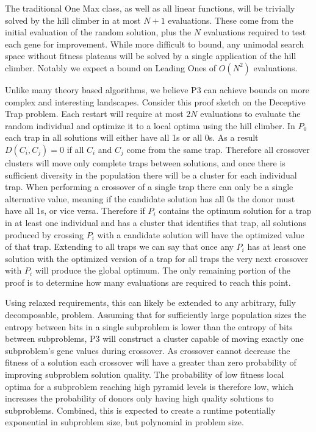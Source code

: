 \documentclass{sig-alternate}
\begin{document}
The traditional One Max class, as well as all linear functions, will be
trivially solved by the hill climber in at most $N+1$ evaluations.  These come
from the initial evaluation of the random solution, plus the $N$ evaluations required
to test each gene for improvement.  While more difficult to bound, any unimodal
search space without fitness plateaus will be solved by a single application
of the hill climber.  Notably we expect a bound on Leading Ones of $O(N^2)$ evaluations.

Unlike many theory based algorithms, we believe P3 can achieve bounds on more
complex and interesting landscapes.  Consider this proof sketch on the Deceptive
Trap problem.  Each restart will require at most $2N$ evaluations to evaluate the
random individual and optimize it to a local optima using the hill climber.  In
$P_0$ each trap in all solutions will either have all 1s or all 0s.  As a result $D(C_i, C_j) = 0$
if all $C_i$ and $C_j$ come from the same trap.  Therefore all crossover clusters
will move only complete traps between solutions, and once there is sufficient
diversity in the population there will be a cluster for each individual trap.
When performing a crossover of a single trap there can only be a single alternative
value, meaning if the candidate solution has all 0s the donor must have all 1s, or vice
versa.  Therefore if $P_i$ contains the optimum solution for a trap in at least one
individual and has a cluster that identifies that trap, all solutions produced by crossing
$P_i$ with a candidate solution will have the optimized value of that trap.  Extending to
all traps we can say that once any $P_i$ has at least one solution with the optimized
version of a trap for all traps the very next crossover with $P_i$ will produce the global optimum.
The only remaining portion of the proof is to determine how many evaluations are required to reach this point.

Using relaxed requirements, this can likely be extended to any arbitrary, fully decomposable,
problem. Assuming that for sufficiently large population sizes the entropy between
bits in a single subproblem is lower than the entropy of bits between subproblems,
P3 will construct a cluster capable of moving exactly one subproblem's gene values
during crossover.  As crossover cannot decrease the fitness of a solution each
crossover will have a greater than zero probability of improving subproblem solution quality.
The probability of low fitness local optima for a subproblem reaching high pyramid levels
is therefore low, which increases the probability of donors only having high quality
solutions to subproblems.  Combined, this is expected to create a runtime potentially
exponential in subproblem size, but polynomial in problem size.
\end{document}
